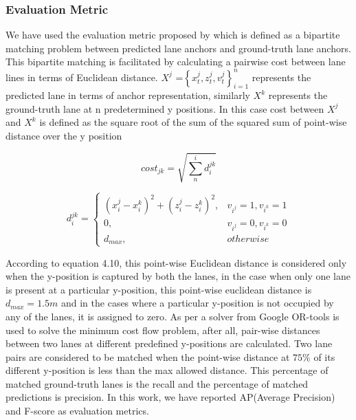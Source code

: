              \subsubsection{Evaluation Metric}
            
            We have used the evaluation metric proposed by \cite{guo2020gen} which is defined as a bipartite matching problem between predicted lane anchors and ground-truth lane anchors. This bipartite matching is facilitated by calculating a pairwise cost between lane lines in terms of Euclidean distance. $X^{j}$ =$ \left\{x^{j}_{t},z^{j}_{t},v^{j}_{t}\right\}_{i=1}^{n}     $ represents the predicted lane in terms of anchor representation, similarly $X^{k}$ represents the ground-truth lane at n predetermined y positions. In this case cost between $X^{j}$ and $X^{k}$ is defined as the square root of the sum of the squared sum of point-wise distance over the y position
            
            \begin{equation}
             cost_{jk} = \sqrt{\sum_n^i d_{i}^{jk}}
            \end{equation}
            
            \begin{equation}
              d_{i}^{jk} = \begin{cases}(x_{i}^{j} - x_{i}^{k} )^{2} + (z_{i}^{j} - z_{i}^{k} )^{2},  & v_{i^{j}} =1, v_{i^{k}} =1 \\0,   & v_{i^{j}} =0, v_{i^{k}} =0\\ d_{max}, & otherwise\end{cases}
            \end{equation}
            
            According to equation 4.10, this point-wise Euclidean distance is considered only when the y-position is captured by both the lanes, in the case when only one lane is present at a particular y-position, this point-wise euclidean distance is $d_{max} = 1.5m$ and in the cases where a particular y-position is not occupied by any of the lanes, it is assigned to zero. As per \cite{guo2020gen} a solver from Google OR-tools is used to solve the minimum cost flow problem, after all, pair-wise distances between two lanes at different predefined y-positions are calculated. Two lane pairs are considered to be matched when the point-wise distance at $75\%$ of its different y-position is less than the max allowed distance. This percentage of matched ground-truth lanes is the recall and the percentage of matched predictions is  precision. In this work, we have reported AP(Average Precision) and F-score as evaluation metrics. 
            

